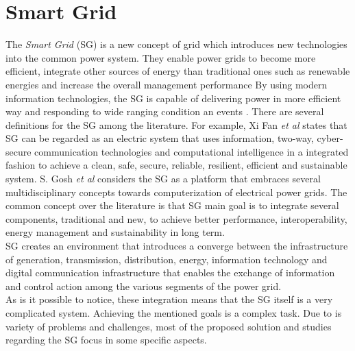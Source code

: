 \chapter{Smart Grid}
The \textit{Smart Grid} (SG) is a new concept of grid which introduces new technologies into the common power system. They enable power grids to become more efficient, integrate other sources of energy than traditional ones such as renewable energies and increase the overall management performance By using modern information technologies, the SG is capable of delivering power in more efficient way and responding to wide ranging condition an events \cite{journals/comsur/FangMXY12}.
There are several definitions for the SG among the literature. For example, Xi Fan \textit{et al}\cite{journals/comsur/FangMXY12} states that SG can be regarded as an electric system that uses information, two-way, cyber-secure communication technologies and computational intelligence in a integrated fashion to achieve a clean, safe, secure, reliable, resilient, efficient and sustainable system. S. Gosh \textit{et al} \cite{conf/isgt/GhoshPR13} considers the SG as a platform that embraces several multidisciplinary concepts towards computerization of electrical power grids. The common concept over the literature is that SG main goal is to integrate several components, traditional and new, to achieve better performance, interoperability, energy management and sustainability in long term. \\
SG creates an environment that introduces a converge between the infrastructure of generation, transmission, distribution, energy, information technology and digital communication infrastructure that enables the exchange of information and control action among the various segments of the power grid.\\
As is it possible to notice, these integration means that the SG itself is a very complicated system. Achieving the mentioned goals is a complex task. Due to is variety of problems and challenges, most of the proposed solution and studies regarding the SG focus in some specific aspects. 
